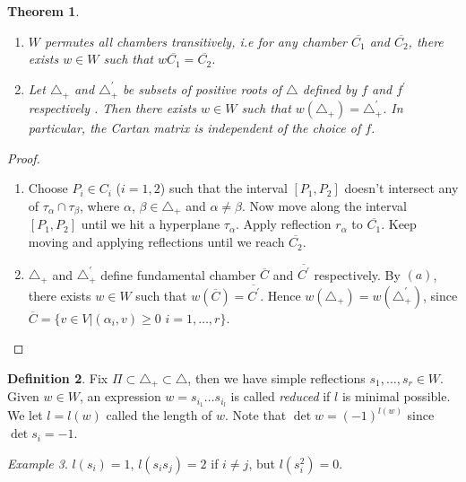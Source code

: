 \documentclass[10pt,twoside]{article}
\newtheorem{theorem}{Theorem}
\theoremstyle{definition}
\newtheorem{definition}[theorem]{Definition}
\theoremstyle{remark}
\newtheorem{example}[theorem]{Example}
\begin{document}
\begin{theorem}\ 
\renewcommand{\labelenumi}{(\alph{enumi})}
\begin{enumerate}
\item $W$ permutes all chambers transitively, i.e for any
chamber $\overline{C_{1}}$ and $\overline{C_{2}}$, there exists
$w\in W$ such that $w\overline{C_{1}}=\overline{C_{2}}$.

\item Let $\triangle_{+}$ and $\triangle_{+}^{'}$ be
subsets of positive roots of $\triangle$ defined by $f$ and
$f^{'}$ respectively . Then there exists $w\in W$ such that
$w(\triangle_{+})=\triangle_{+}^{'}$. In particular, the Cartan
matrix is independent of the choice of $f$.
\end{enumerate}
\end{theorem}

\begin{proof}\ 
\renewcommand{\labelenumi}{(\alph{enumi})}
\begin{enumerate}
\item Choose $P_{i}\in C_{i}$ ($i=1,2$) such that the
interval $[P_{1},P_{2}]$ doesn't intersect any of
$\tau_{\alpha}\cap\tau_{\beta}$, where $\alpha$,
$\beta\in\triangle_{+}$ and $\alpha\neq\beta$. Now move along the
interval $[P_{1},P_{2}]$ until we hit a hyperplane
$\tau_{\alpha}$. Apply reflection $r_{\alpha}$ to
$\overline{C_{1}}$. Keep moving and applying reflections until we
reach $\overline{C_{2}}$.

\item $\triangle_{+}$ and $\triangle_{+}^{'}$ define
fundamental chamber $\overline{C}$ and $\overline{C^{'}}$
respectively. By $(a)$, there exists $w\in W$ such that
$w(\overline{C})=\overline{C^{'}}$. Hence
$w(\triangle_{+})=w(\triangle_{+}^{'})$, since
$\overline{C}=\{v\in V|(\alpha_{i},v)\geq 0$ $i=1,\ldots,r\}$.
\end{enumerate}
\end{proof}



\begin{definition}
 Fix $\Pi\subset\triangle_{+}\subset\triangle$, then we
have simple reflections $s_{1},\ldots,s_{r}\in W$. Given $w\in W$,
an expression $w=s_{i_{1}}\ldots s_{i_{l}}$ is called {\em reduced} if
$l$ is minimal possible. We let $l=l(w)$ called the length of $w$.
Note that $\det w=(-1)^{l(w)}$ since $\det s_{i}=-1$.
\end{definition}

\begin{example}
 $l(s_{i})=1$, $l(s_{i}s_{j})=2$ if $i\neq j$,
but $l(s_{i}^{2})=0$.
\end{example}
\end{document}
